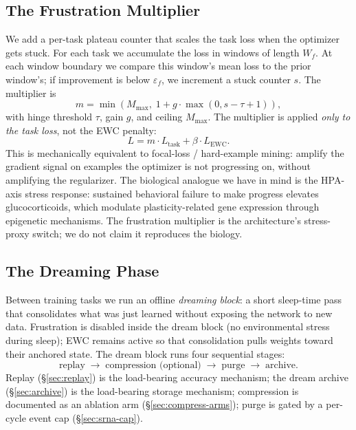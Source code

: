 \documentclass[11pt]{article}
\newcommand{\Lewc}{L_{\text{EWC}}}
\newcommand{\Ltask}{L_{\text{task}}}
\begin{document}
\subsection{The Frustration Multiplier}
\label{sec:frustration}\label{app:frustration}

We add a per-task plateau counter that scales the task loss when the
optimizer gets stuck. For each task we accumulate the loss in windows
of length $W_f$. At each window boundary we compare this window's mean
loss to the prior window's; if improvement is below $\varepsilon_f$, we
increment a stuck counter $s$. The multiplier is
\begin{equation}
  m = \min(M_{\max},\; 1 + g \cdot \max(0, s - \tau + 1)),
\end{equation}
with hinge threshold $\tau$, gain $g$, and ceiling $M_{\max}$. The
multiplier is applied \emph{only to the task loss}, not the EWC
penalty:
\begin{equation}
  L = m \cdot \Ltask + \beta \cdot \Lewc.
\end{equation}
This is mechanically equivalent to focal-loss / hard-example mining:
amplify the gradient signal on examples the optimizer is not
progressing on, without amplifying the regularizer. The biological
analogue we have in mind is the HPA-axis stress response: sustained
behavioral failure to make progress elevates glucocorticoids, which
modulate plasticity-related gene expression through epigenetic
mechanisms. The frustration multiplier is the architecture's
stress-proxy switch; we do not claim it reproduces the biology.

\subsection{The Dreaming Phase}
\label{sec:dreaming-phase}\label{app:dream}

Between training tasks we run an offline \emph{dreaming block}: a short
sleep-time pass that consolidates what was just learned without
exposing the network to new data. Frustration is disabled inside the
dream block (no environmental stress during sleep); EWC remains active
so that consolidation pulls weights toward their anchored state. The
dream block runs four sequential stages:
\begin{equation*}
  \text{replay} \;\to\; \text{compression (optional)} \;\to\;
  \text{purge} \;\to\; \text{archive}.
\end{equation*}
Replay (\S\ref{sec:replay}) is the load-bearing accuracy mechanism;
the dream archive (\S\ref{sec:archive}) is the load-bearing storage
mechanism; compression is documented as an ablation arm
(\S\ref{sec:compress-arms}); purge is gated by a per-cycle event cap
(\S\ref{sec:srna-cap}).
\end{document}

